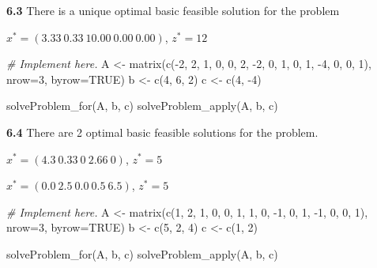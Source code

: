 \documentclass[
]{article}
\newenvironment{Shaded}{\begin{snugshade}}{\end{snugshade}}
\newcommand{\AttributeTok}[1]{\textcolor[rgb]{0.77,0.63,0.00}{#1}}
\newcommand{\CommentTok}[1]{\textcolor[rgb]{0.56,0.35,0.01}{\textit{#1}}}
\newcommand{\ConstantTok}[1]{\textcolor[rgb]{0.00,0.00,0.00}{#1}}
\newcommand{\DecValTok}[1]{\textcolor[rgb]{0.00,0.00,0.81}{#1}}
\newcommand{\FunctionTok}[1]{\textcolor[rgb]{0.00,0.00,0.00}{#1}}
\newcommand{\NormalTok}[1]{#1}
\newcommand{\OtherTok}[1]{\textcolor[rgb]{0.56,0.35,0.01}{#1}}
\newcommand{\SpecialCharTok}[1]{\textcolor[rgb]{0.00,0.00,0.00}{#1}}
\begin{document}
\textbf{6.3} There is a unique optimal basic feasible solution for the
problem

\(x^*= (3.33\  0.33\ 10.00\  0.00\  0.00)\), \(z^*= 12\)

\begin{Shaded}
\begin{Highlighting}[]
\CommentTok{\# Implement here.}
\NormalTok{A }\OtherTok{\textless{}{-}} \FunctionTok{matrix}\NormalTok{(}\FunctionTok{c}\NormalTok{(}\SpecialCharTok{{-}}\DecValTok{2}\NormalTok{, }\DecValTok{2}\NormalTok{, }\DecValTok{1}\NormalTok{, }\DecValTok{0}\NormalTok{, }\DecValTok{0}\NormalTok{, }\DecValTok{2}\NormalTok{, }\SpecialCharTok{{-}}\DecValTok{2}\NormalTok{, }\DecValTok{0}\NormalTok{, }\DecValTok{1}\NormalTok{, }\DecValTok{0}\NormalTok{, }\DecValTok{1}\NormalTok{, }\SpecialCharTok{{-}}\DecValTok{4}\NormalTok{, }\DecValTok{0}\NormalTok{, }\DecValTok{0}\NormalTok{, }\DecValTok{1}\NormalTok{), }\AttributeTok{nrow=}\DecValTok{3}\NormalTok{, }\AttributeTok{byrow=}\ConstantTok{TRUE}\NormalTok{)}
\NormalTok{b }\OtherTok{\textless{}{-}} \FunctionTok{c}\NormalTok{(}\DecValTok{4}\NormalTok{, }\DecValTok{6}\NormalTok{, }\DecValTok{2}\NormalTok{)}
\NormalTok{c }\OtherTok{\textless{}{-}} \FunctionTok{c}\NormalTok{(}\DecValTok{4}\NormalTok{, }\SpecialCharTok{{-}}\DecValTok{4}\NormalTok{)}

\FunctionTok{solveProblem\_for}\NormalTok{(A, b, c)}
\FunctionTok{solveProblem\_apply}\NormalTok{(A, b, c)}
\end{Highlighting}
\end{Shaded}

\textbf{6.4} There are 2 optimal basic feasible solutions for the
problem.

\(x^*= (4.3\ 0.33\ 0\ 2.66\ 0)\), \(z^*= 5\)

\(x^*= (0.0\  2.5\  0.0\  0.5\  6.5)\), \(z^*= 5\)

\begin{Shaded}
\begin{Highlighting}[]
\CommentTok{\# Implement here.}
\NormalTok{A }\OtherTok{\textless{}{-}} \FunctionTok{matrix}\NormalTok{(}\FunctionTok{c}\NormalTok{(}\DecValTok{1}\NormalTok{, }\DecValTok{2}\NormalTok{, }\DecValTok{1}\NormalTok{, }\DecValTok{0}\NormalTok{, }\DecValTok{0}\NormalTok{, }\DecValTok{1}\NormalTok{, }\DecValTok{1}\NormalTok{, }\DecValTok{0}\NormalTok{, }\SpecialCharTok{{-}}\DecValTok{1}\NormalTok{, }\DecValTok{0}\NormalTok{, }\DecValTok{1}\NormalTok{, }\SpecialCharTok{{-}}\DecValTok{1}\NormalTok{, }\DecValTok{0}\NormalTok{, }\DecValTok{0}\NormalTok{, }\DecValTok{1}\NormalTok{), }\AttributeTok{nrow=}\DecValTok{3}\NormalTok{, }\AttributeTok{byrow=}\ConstantTok{TRUE}\NormalTok{)}
\NormalTok{b }\OtherTok{\textless{}{-}} \FunctionTok{c}\NormalTok{(}\DecValTok{5}\NormalTok{, }\DecValTok{2}\NormalTok{, }\DecValTok{4}\NormalTok{)}
\NormalTok{c }\OtherTok{\textless{}{-}} \FunctionTok{c}\NormalTok{(}\DecValTok{1}\NormalTok{, }\DecValTok{2}\NormalTok{)}

\FunctionTok{solveProblem\_for}\NormalTok{(A, b, c)}
\FunctionTok{solveProblem\_apply}\NormalTok{(A, b, c)}
\end{Highlighting}
\end{Shaded}
\end{document}
